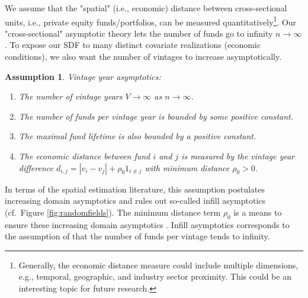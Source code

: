 \documentclass[12pt]{article}
\newtheorem{assume}{Assumption}
\begin{document}
We assume that the "spatial" (i.e., economic) distance between cross-sectional units, i.e., private equity funds/portfolios, can be measured quantitatively\footnote{Generally, the economic distance measure could include multiple dimensions, e.g., temporal, geographic, and industry sector proximity. This could be an interesting topic for future research.}.
Our "cross-sectional" asymptotic theory lets the number of funds go to infinity $n \to \infty$.
To expose our SDF to many distinct covariate realizations (economic conditions), we also want the number of vintages to increase asymptotically.
\begin{assume}
	\label{as:vya}
	Vintage year asymptotics:
	\begin{enumerate}
		\item The number of vintage years $V \to \infty$ as $n \to \infty$.
		\item The number of funds per vintage year is bounded by some positive constant.
		\item The maximal fund lifetime is also bounded by a positive constant.
		\item The economic distance between fund $i$ and $j$ is measured by the vintage year difference $d_{i,j} = | v_i - v_j | +  \rho_0 1_{i \neq j}$ with minimum distance $\rho_0 > 0$.
	\end{enumerate}
\end{assume}
In terms of the spatial estimation literature, this assumption postulates increasing domain asymptotics and rules out so-called infill asymptotics (cf.\ Figure \ref{fig:randomfields}).
The minimum distance term $\rho_0$ is a means to ensure these increasing domain asymptotics \cite[Assumption 1]{JP12}.
Infill asymptotics corresponds to the assumption of \cite{DLP12} that the number of funds per vintage tends to infinity.
\end{document}
